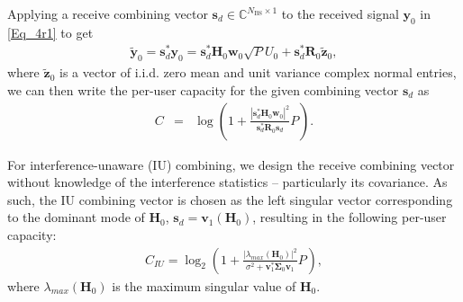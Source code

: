 \documentclass[12pt, draftclsnofoot, onecolumn]{IEEEtran}
\theoremstyle{plain}
\begin{document}
{\color{black} 
Applying a receive combining vector $\textbf{s}_d \in \mathbb{C}^{N_{\text{BS}}\times 1}$ to the received signal ${\textbf{y}}_0$ in \eqref{Eq_4r1} to get %
\begin{eqnarray*}
\tilde{\textbf{y}}_0 = \textbf{s}_d^{\ast} \textbf{y}_{0} = \textbf{s}_d^{\ast} \textbf{H}_{0} \textbf{w}_{0} \sqrt{P} U_0 + \textbf{s}_d^{\ast} \textbf{R}_{0} \tilde{\textbf{z}}_{0},
\end{eqnarray*}
where $\tilde{\textbf{z}}_{0} $ is a vector of i.i.d. zero mean and unit variance complex normal entries, we can then write the per-user capacity for the given combining vector $\textbf{s}_d$ as
\begin{eqnarray}\label{EQ::Original_Rate}
C&\!\!\!\!=\!\!\!\!& \log{\left( 1+ \frac{|\textbf{s}_d^{\ast} \mathbf{H}_{0} \mathbf{w}_{0}|^2}{\textbf{s}_d^{\ast} \mathbf{R}_0 \textbf{s}_d} P_{} \right)}.
\end{eqnarray}

For interference-unaware (IU) combining, we design the receive combining vector without knowledge of the interference statistics -- particularly its covariance. As such, the IU combining vector is chosen  as the left singular vector corresponding to the dominant mode of $\textbf{H}_{0}$, $\textbf{s}_d = \mathbf{v}_1(\textbf{H}_{0})$, resulting in the following per-user capacity:
\begin{align}\label{Eq::RateDEq2}
\!\!\!\!\!\!C_{IU}=  {\log_2}{\left( 1+\frac{|\lambda_{max}(\textbf{H}_{0})|^2}{\sigma^2 + \mathbf{v}_1^\ast \boldsymbol{\Sigma}_{0} \mathbf{v}_1} P_{} \right)},
\end{align}
where $\lambda_{max}(\textbf{H}_{0})$ is the maximum singular value of $\textbf{H}_{0}$. %

}
\end{document}
